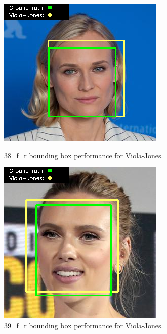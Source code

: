 \documentclass{l4proj}
\begin{document}
\begin{appendices}
\begin{figure}[h!]
  \centering
  \begin{minipage}{0.49\textwidth}
    \centering
     \includegraphics[width=\textwidth]{images/appendix/viola/38.png}
    \caption{38\_f\_r bounding box performance for Viola-Jones.}
    \label{whoopi_result}
  \end{minipage}
    \hfill
    \begin{minipage}{0.49\textwidth}
    \centering
     \includegraphics[width=\textwidth]{images/appendix/viola/39.png}
    \caption{39\_f\_r bounding box performance for Viola-Jones.}
    \label{whoopi_result}
  \end{minipage}
\end{figure}


\end{appendices}
\end{document}
